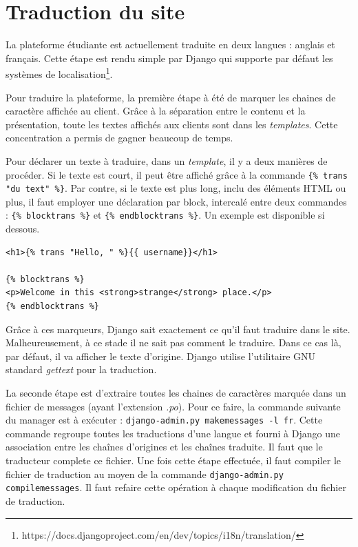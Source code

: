 \documentclass[a4paper,12pt]{article}
\begin{document}
\section{Traduction du site}

La plateforme étudiante est actuellement traduite en deux langues : anglais et français.
Cette étape est rendu simple par Django qui supporte par défaut les systèmes
de localisation\footnote{https://docs.djangoproject.com/en/dev/topics/i18n/translation/}.

Pour traduire la plateforme, la première étape à été de marquer les chaines de
caractère affichée au client. Grâce à la séparation entre le contenu et la présentation,
toute les textes affichés aux clients sont dans les \textit{templates}. Cette concentration
a permis de gagner beaucoup de temps.

Pour déclarer un texte à traduire, dans un \textit{template}, il y a deux manières
de procéder. Si le texte est court, il peut être affiché grâce à la commande 
\texttt{\{\% trans "du text" \%\}}. Par contre, si le texte est plus long, inclu des
éléments HTML ou plus, il faut employer une déclaration par block, intercalé entre
deux commandes : \texttt{\{\% blocktrans \%\}} et \texttt{\{\% endblocktrans \%\}}.
Un exemple est disponible si dessous.

\begin{verbatim}
<h1>{% trans "Hello, " %}{{ username}}</h1>

{% blocktrans %}
<p>Welcome in this <strong>strange</strong> place.</p>
{% endblocktrans %}
\end{verbatim}

Grâce à ces marqueurs, Django sait exactement ce qu'il faut traduire dans le site.
Malheureusement, à ce stade il ne sait pas comment le traduire. Dans ce cas là,
par défaut, il va afficher le texte d'origine. Django utilise l'utilitaire GNU
standard \textit{gettext} pour la traduction.

La seconde étape est d'extraire toutes les chaines de caractères
marquée dans un fichier de messages (ayant l'extension \textit{.po}).
Pour ce faire, la commande suivante du
manager est à exécuter : \texttt{django-admin.py makemessages -l fr}. Cette commande
regroupe toutes les traductions d'une langue et fourni à Django une association
entre les chaînes d'origines et les chaînes traduite. Il faut que le traducteur
complete ce fichier. Une fois cette étape effectuée, il faut compiler
le fichier de traduction au moyen de la commande \texttt{django-admin.py compilemessages}.
Il faut refaire cette opération à chaque modification du fichier de traduction.
\end{document}
